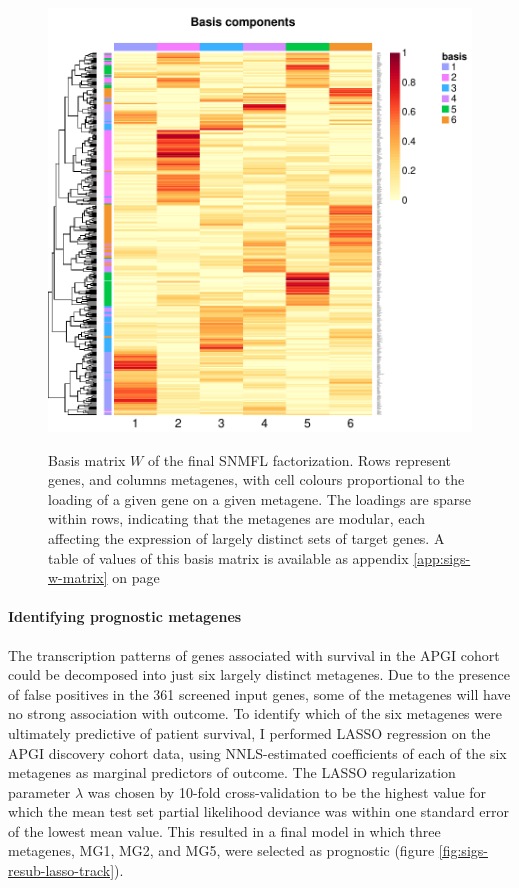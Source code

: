 \documentclass[dissertation.tex]{subfiles}
\begin{document}
\begin{figure}
\centering
\includegraphics[width=.7\linewidth]{analysis/biosurv/reports/18_SIS_diag_dsd_final/figure/nmf-plots-2}
\label{fig:sigs-nmf-basis}
\caption{Basis matrix $W$ of the final \acrshort{SNMFL} factorization.  Rows represent genes, and columns metagenes, with cell colours proportional to the loading of a given gene on a given metagene.  The loadings are sparse within rows, indicating that the metagenes are modular, each affecting the expression of largely distinct sets of target genes.  A table of values of this basis matrix is available as appendix \ref{app:sigs-w-matrix} on page \pageref{app:sigs-w-matrix}}
\end{figure}

\paragraph{Identifying prognostic metagenes}
The transcription patterns of genes associated with survival in the \gls{APGI} cohort could be decomposed into just six largely distinct metagenes.  Due to the presence of false positives in the 361 screened input genes, some of the metagenes will have no strong association with outcome.  To identify which of the six metagenes were ultimately predictive of patient survival, I performed \gls{LASSO} regression on the \gls{APGI} discovery cohort data, using \gls{NNLS}-estimated coefficients of each of the six metagenes as marginal predictors of outcome.  The \gls{LASSO} regularization parameter $\lambda$ was chosen by 10-fold cross-validation to be the highest value for which the mean test set partial likelihood deviance was within one standard error of the lowest mean value.  This resulted in a final model in which three metagenes, MG1, MG2, and MG5, were selected as prognostic (figure \ref{fig:sigs-resub-lasso-track}).
\end{document}
